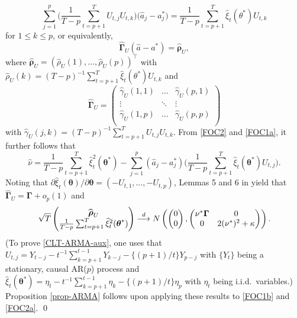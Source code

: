 \begin{equation}\label{FOC1a}
\sum_{j=1}^p \Big( \frac{1}{T-p} \sum_{t=p+1}^T U_{t,j} U_{t,k} \Big) \big( \widehat{a}_j - a_j^* \big) = \frac{1}{T-p} \sum\limits_{t=p+1}^T \widehat{\xi}_t(\theta^*) U_{t,k} 
\end{equation}
for $1 \le k \le p$, or equivalently, 
\begin{equation}\label{FOC1b} 
\widehat{\boldsymbol{\Gamma}}_U ( \widehat{a} - a^*) = \widehat{\boldsymbol{\rho}}_U,
\end{equation}
where $\widehat{\boldsymbol{\rho}}_U = (\widehat{\rho}_U(1),\ldots,\widehat{\rho}_U(p))^\top$ with $\widehat{\rho}_U(k) = (T-p)^{-1} \sum_{t=p+1}^T \widehat{\xi}_t(\theta^*) U_{t,k}$ and  
\[ \widehat{\boldsymbol{\Gamma}}_U =
\begin{pmatrix} 
\widehat{\gamma}_U(1,1) & \dots  & \widehat{\gamma}_U(p,1) \\
\vdots      & \ddots & \vdots      \\
\widehat{\gamma}_U(1,p) & \dots  & \widehat{\gamma}_U(p,p) \\
\end{pmatrix} 
\]
with $\widehat{\gamma}_U(j,k) = (T-p)^{-1} \sum_{t=p+1}^T U_{t,j} U_{t,k}$. From \eqref{FOC2} and \eqref{FOC1a}, it further follows that
\begin{equation}\label{FOC2a}
\widehat{\nu} = \frac{1}{T-p} \sum\limits_{t=p+1}^T \widehat{\xi}_t^2(\boldsymbol{\theta}^*) - \sum\limits_{j=1}^p (\widehat{a}_j - a_j^*) \Big( \frac{1}{T-p} \sum\limits_{t=p+1}^T \widehat{\xi}_t(\boldsymbol{\theta}^*) U_{t,j} \Big).
\end{equation}
Noting that $\partial \widehat{\xi}_t(\boldsymbol{\theta})/ \partial \boldsymbol{\theta} = (-U_{t,1},\ldots,-U_{t,p})$, Lemmas 5 and 6 in \cite{PhamDinh1978} yield that $\widehat{\boldsymbol{\Gamma}}_U = \boldsymbol{\Gamma} + o_p(1)$ and
\begin{equation}\label{CLT-ARMA-aux}
\sqrt{T} \begin{pmatrix} \widehat{\boldsymbol{\rho}}_U \\ \frac{1}{T-p} \sum_{t=p+1}^T \widehat{\xi}_t^2(\boldsymbol{\theta}^*) \end{pmatrix} \stackrel{d}{\longrightarrow} N \left( \begin{pmatrix} 0 \\ 0 \end{pmatrix}, \begin{pmatrix} \nu^* \boldsymbol{\Gamma} & 0 \\ 0 & 2 (\nu^*)^2 + \kappa \end{pmatrix} \right). 
\end{equation}
(To prove \eqref{CLT-ARMA-aux}, one uses that $U_{t,j} = Y_{t-j} - t^{-1} \sum_{k=p+1}^{t-1} Y_{k-j} - \{(p+1)/t\} Y_{p-j}$ with $\{Y_t\}$ being a stationary, causal AR($p$) process and $\widehat{\xi}_t(\boldsymbol{\theta}^*) = \eta_t - t^{-1} \sum_{k=p+1}^{t-1} \eta_k - \{(p+1)/t\} \eta_p$ with $\eta_t$ being i.i.d.\ variables.) Proposition \ref{prop-ARMA} follows upon applying these results to \eqref{FOC1b} and \eqref{FOC2a}. \qed


\newpage
